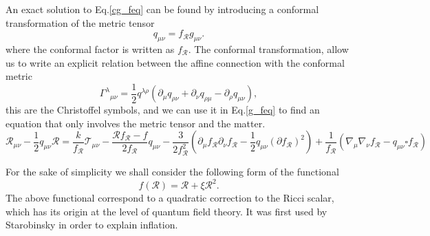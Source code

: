 \documentclass{article}
\begin{document}
An exact solution to Eq.\eqref{cg_feq} can be found by introducing a conformal transformation
of the metric tensor
\begin{equation}
    q_{\mu\nu} = f_{\mathcal{R}}g_{\mu\nu}.
\end{equation}
where the conformal factor is written as $f_{\mathcal{R}}$. The conformal transformation, allow us
to write an explicit relation between the affine connection with the conformal metric
\begin{equation}
    \Gamma^{\lambda}{}_{\mu\nu} = \frac{1}{2}q^{\lambda\rho}\left(\partial_\mu q_{\rho\nu} + 
    \partial_\nu q_{\rho\mu} - \partial_\rho q_{\mu\nu}\right),
\end{equation}
this are the Christoffel symbols, and we can use it in Eq.\eqref{g_feq} to find an equation
that only involves the metric tensor and the matter.
\begin{equation}
    \mathcal{R}_{\mu\nu} - \frac{1}{2}q_{\mu\nu}\mathcal{R} = \frac{k}{f_{\mathcal{R}}}\mathcal{T}_{\mu\nu}
    - \frac{\mathcal{R}f_{\mathcal{R}} - f}{2f_{\mathcal{R}}}q_{\mu\nu} - \frac{3}{2f^2_{\mathcal{R}}}
    \left(\partial_\mu f_{\mathcal{R}} \partial_\nu f_{\mathcal{R}} - \frac{1}{2}q_{\mu\nu}(\partial f_{\mathcal{R}})^2\right)
    + \frac{1}{f_{\mathcal{R}}}\left(\nabla_\mu\nabla_\nu f_{\mathcal{R}} - q_{\mu\nu}\square f_{\mathcal{R}}\right)
\end{equation}

For the sake of simplicity we shall consider the following form of the functional
\begin{equation}
    f(\mathcal{R}) = \mathcal{R} + \xi \mathcal{R}^2.
\end{equation}
The above functional correspond to a quadratic correction to the Ricci scalar, which has
its origin at the level of quantum field theory. It was first used by Starobinsky in order 
to explain inflation.
\end{document}

